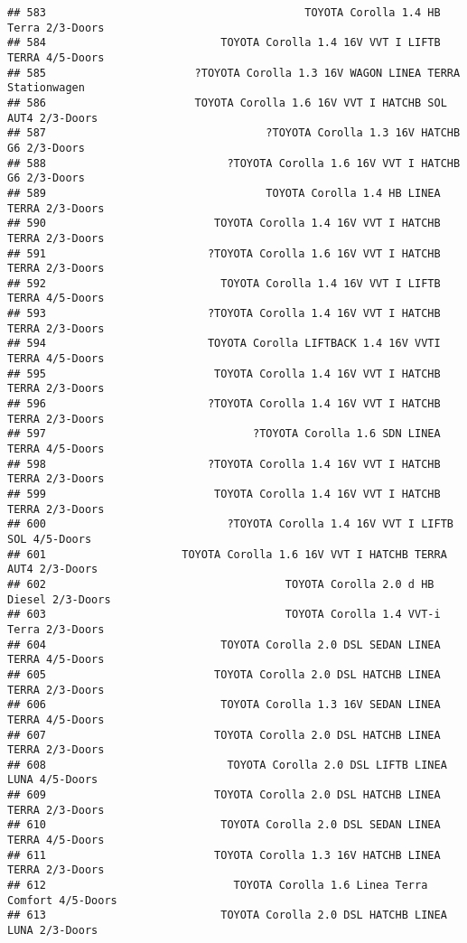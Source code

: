 \documentclass[]{article}
\begin{document}
\begin{verbatim}
## 583                                        TOYOTA Corolla 1.4 HB Terra 2/3-Doors
## 584                           TOYOTA Corolla 1.4 16V VVT I LIFTB TERRA 4/5-Doors
## 585                       ?TOYOTA Corolla 1.3 16V WAGON LINEA TERRA Stationwagen
## 586                       TOYOTA Corolla 1.6 16V VVT I HATCHB SOL AUT4 2/3-Doors
## 587                                  ?TOYOTA Corolla 1.3 16V HATCHB G6 2/3-Doors
## 588                            ?TOYOTA Corolla 1.6 16V VVT I HATCHB G6 2/3-Doors
## 589                                  TOYOTA Corolla 1.4 HB LINEA TERRA 2/3-Doors
## 590                          TOYOTA Corolla 1.4 16V VVT I HATCHB TERRA 2/3-Doors
## 591                         ?TOYOTA Corolla 1.6 16V VVT I HATCHB TERRA 2/3-Doors
## 592                           TOYOTA Corolla 1.4 16V VVT I LIFTB TERRA 4/5-Doors
## 593                         ?TOYOTA Corolla 1.4 16V VVT I HATCHB TERRA 2/3-Doors
## 594                         TOYOTA Corolla LIFTBACK 1.4 16V VVTI TERRA 4/5-Doors
## 595                          TOYOTA Corolla 1.4 16V VVT I HATCHB TERRA 2/3-Doors
## 596                         ?TOYOTA Corolla 1.4 16V VVT I HATCHB TERRA 2/3-Doors
## 597                                ?TOYOTA Corolla 1.6 SDN LINEA TERRA 4/5-Doors
## 598                         ?TOYOTA Corolla 1.4 16V VVT I HATCHB TERRA 2/3-Doors
## 599                          TOYOTA Corolla 1.4 16V VVT I HATCHB TERRA 2/3-Doors
## 600                            ?TOYOTA Corolla 1.4 16V VVT I LIFTB SOL 4/5-Doors
## 601                     TOYOTA Corolla 1.6 16V VVT I HATCHB TERRA AUT4 2/3-Doors
## 602                                     TOYOTA Corolla 2.0 d HB Diesel 2/3-Doors
## 603                                     TOYOTA Corolla 1.4 VVT-i Terra 2/3-Doors
## 604                           TOYOTA Corolla 2.0 DSL SEDAN LINEA TERRA 4/5-Doors
## 605                          TOYOTA Corolla 2.0 DSL HATCHB LINEA TERRA 2/3-Doors
## 606                           TOYOTA Corolla 1.3 16V SEDAN LINEA TERRA 4/5-Doors
## 607                          TOYOTA Corolla 2.0 DSL HATCHB LINEA TERRA 2/3-Doors
## 608                            TOYOTA Corolla 2.0 DSL LIFTB LINEA LUNA 4/5-Doors
## 609                          TOYOTA Corolla 2.0 DSL HATCHB LINEA TERRA 2/3-Doors
## 610                           TOYOTA Corolla 2.0 DSL SEDAN LINEA TERRA 4/5-Doors
## 611                          TOYOTA Corolla 1.3 16V HATCHB LINEA TERRA 2/3-Doors
## 612                             TOYOTA Corolla 1.6 Linea Terra Comfort 4/5-Doors
## 613                           TOYOTA Corolla 2.0 DSL HATCHB LINEA LUNA 2/3-Doors

\end{verbatim}
\end{document}
